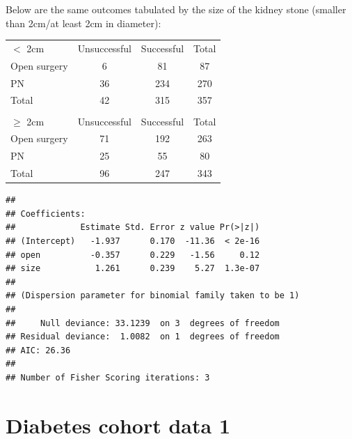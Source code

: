 \documentclass[10pt]{beamer}\usepackage[]{graphicx}\usepackage[]{color}
\makeatletter
\newenvironment{kframe}{%
 \def\at@end@of@kframe{}%
 \ifinner\ifhmode%
  \def\at@end@of@kframe{\end{minipage}}%
  \begin{minipage}{\columnwidth}%
 \fi\fi%
 \def\FrameCommand##1{\hskip\@totalleftmargin \hskip-\fboxsep
 \colorbox{shadecolor}{##1}\hskip-\fboxsep
     \hskip-\linewidth \hskip-\@totalleftmargin \hskip\columnwidth}%
 \MakeFramed {\advance\hsize-\width
   \@totalleftmargin\z@ \linewidth\hsize
   \@setminipage}}%
 {\par\unskip\endMakeFramed%
 \at@end@of@kframe}
\newenvironment{knitrout}{}{} %
\makeatother
\begin{document}
\begin{frame}
\vspace{-.91in}
\tiny
Below are the same outcomes tabulated by the size of the kidney stone (smaller than 2cm/at least 2cm in diameter):

\begin{table}[h]
	\centering
	\begin{tabular}{lcc|c}
		$<$ 2cm & Unsuccessful &  Successful & Total\\
		Open surgery & 6 & 81 & 87 \\
		PN 			 & 36 & 234 & 270 \\
		\hline
		Total 	& 42 & 315 & 357 \\
		& & &  \\
		$\geq$ 2cm & Unsuccessful &  Successful & Total\\
		Open surgery & 71 & 192 & 263 \\
		PN 			 & 25 & 55 & 80 \\
		\hline
		Total 		& 96 & 247 & 343
	\end{tabular}
\end{table}

\vspace{-.21in}
\begin{knitrout}\tiny
{}\color{fgcolor}\begin{kframe}
\begin{verbatim}
## 
## Coefficients:
##             Estimate Std. Error z value Pr(>|z|)
## (Intercept)   -1.937      0.170  -11.36  < 2e-16
## open          -0.357      0.229   -1.56     0.12
## size           1.261      0.239    5.27  1.3e-07
## 
## (Dispersion parameter for binomial family taken to be 1)
## 
##     Null deviance: 33.1239  on 3  degrees of freedom
## Residual deviance:  1.0082  on 1  degrees of freedom
## AIC: 26.36
## 
## Number of Fisher Scoring iterations: 3
\end{verbatim}
\end{kframe}
\end{knitrout}
\end{frame}



\section{Diabetes cohort data 1}
\end{document}
